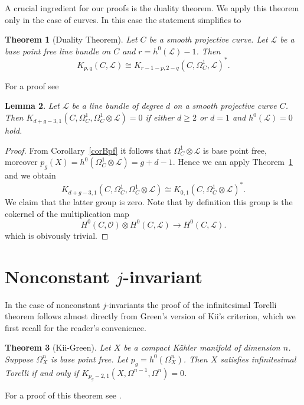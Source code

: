 \documentclass{amsart}
\newcommand{\cL}{\mathcal{L}}
\newcommand{\cO}{\mathcal{O}}
\newtheorem{theorem}{Theorem}[section]
\newtheorem{lemma}[theorem]{Lemma}
\theoremstyle{definition}
\theoremstyle{remark}
\begin{document}
A crucial ingredient for our proofs is the duality theorem. We apply this theorem only in the case of curves. In this case the statement simplifies to
\begin{theorem}[Duality Theorem]\label{dualThm}
Let $C$ be a smooth projective curve. Let $\cL$ be a base point free line bundle on $C$ and $r=h^0(\cL)-1$. Then
\[ K_{p,q}(C,\cL)\cong K_{r-1-p,2-q}(C,\Omega^1_C,\cL)^*.\]
\end{theorem}
 For a proof see \cite[Theorem 2.c.6]{GreenKos}
 
 \begin{lemma} \label{lemVan} Let $\cL$ be a line bundle of degree $d$ on a smooth projective curve $C$.
 Then $ K_{d+g-3,1}(C,\Omega^1_C,\Omega^1_C\otimes \cL)=0$  if either $d\geq 2$ or $d=1$ and $h^0(\cL)=0$ hold.
 \end{lemma}
 \begin{proof}
 From Corollary~\ref{corBpf} it follows that $\Omega^1_C\otimes \cL$ is base point free, moreover $p_g(X)=h^0(\Omega^1_C\otimes \cL)=g+d-1$.  Hence we can apply  Theorem~\ref{dualThm} and we obtain
 \[ K_{d+g-3,1}(C,\Omega^1_C,\Omega^1_C\otimes \cL)\cong K_{0,1}(C,\Omega^1_C\otimes \cL)^*.\]
 We claim that the latter group is zero. Note that by definition this group  is the cokernel of the multiplication map
 \[ H^0(C,\cO) \otimes  H^0(C,\cL) \to H^0(C,\cL).\]
 which is obivously trivial.
\end{proof}


 
\section{Nonconstant $j$-invariant}\label{secNcst}

In the case of nonconstant $j$-invariants the proof of the infinitesimal Torelli theorem follows almost directly from Green's version of Kii's criterion, which we first recall for the reader's convenience.
\begin{theorem}[Kii-Green]\label{KiiThm}
Let $X$ be a compact K\"ahler manifold of dimension $n$. Suppose $\Omega^n_X$ is base point free. Let $p_g=h^0(\Omega^n_X)$. Then $X$ satisfies infinitesimal Torelli if and only if $K_{p_g-2,1}(X,\Omega^{n-1},\Omega^n)=0$.
\end{theorem}
For a proof of this theorem see \cite[Corollary 4.d.3]{GreenKos}.
\end{document}
